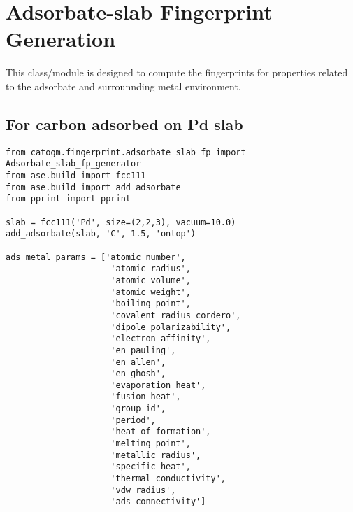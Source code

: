\documentclass[11pt]{article}
\begin{document}
\section{Adsorbate-slab Fingerprint Generation}
\label{sec:orgb97b65a}

This class/module is designed to compute the fingerprints for properties related to the adsorbate and surrounnding metal environment.

\subsection{For carbon adsorbed on Pd slab}
\label{sec:org92cb44f}

\begin{verbatim}
from catogm.fingerprint.adsorbate_slab_fp import Adsorbate_slab_fp_generator
from ase.build import fcc111
from ase.build import add_adsorbate
from pprint import pprint

slab = fcc111('Pd', size=(2,2,3), vacuum=10.0)
add_adsorbate(slab, 'C', 1.5, 'ontop')

ads_metal_params = ['atomic_number',                                            
                     'atomic_radius',                                            
                     'atomic_volume',                                            
                     'atomic_weight',                                            
                     'boiling_point',                                            
                     'covalent_radius_cordero',                                  
                     'dipole_polarizability',                                    
                     'electron_affinity',                                        
                     'en_pauling',                                               
                     'en_allen',                                                 
                     'en_ghosh',                                                 
                     'evaporation_heat',                                         
                     'fusion_heat',                                              
                     'group_id',                                                 
                     'period',                                                   
                     'heat_of_formation',                                        
                     'melting_point',                                            
                     'metallic_radius',                                          
                     'specific_heat',                                            
                     'thermal_conductivity',                                     
                     'vdw_radius',
                     'ads_connectivity']                                               
                                

\end{verbatim}
\end{document}
